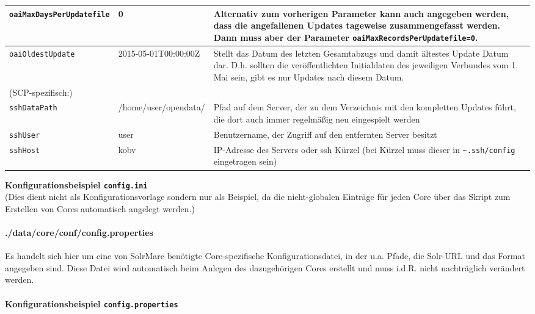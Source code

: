 \documentclass[10pt]{article}
\begin{document}
\begin{center}
\begin{longtable}{| l | p{5cm} | p{5cm} | }
	\texttt{oaiMaxDaysPerUpdatefile} & 0 & Alternativ zum vorherigen Parameter kann auch angegeben werden, dass die angefallenen Updates tageweise zusammengefasst werden. Dann muss aber der Parameter \texttt{oaiMaxRecordsPerUpdatefile=0}.\\ \hline	
	
	\texttt{oaiOldestUpdate} & 2015-05-01T00:00:00Z & Stellt das Datum des letzten Gesamtabzugs und damit ältestes Update Datum dar. D.h. sollten die veröffentlichten Initialdaten des jeweiligen Verbundes vom 1. Mai sein, gibt es nur Updates nach diesem Datum. \\ \hline	
	

	\multicolumn{3}{l}{(SCP-spezifisch:)} \\ \hline
	
	\texttt{sshDataPath} & /home/user/opendata/ & Pfad auf dem Server, der zu dem Verzeichnis mit den kompletten Updates führt, die dort auch immer regelmäßig neu eingespielt werden \\ \hline
	
	\texttt{sshUser} & user & Benutzername, der Zugriff auf den entfernten Server besitzt \\ \hline
		
	\texttt{sshHost} & kobv & IP-Adresse des Servers oder ssh Kürzel (bei Kürzel muss dieser in \texttt{\textasciitilde.ssh/config} eingetragen sein) \\ \hline
	
	
\end{longtable}
\end{center}

\lstset{
	numbers=left, 
	numberstyle=\small, 
	numbersep=8pt, 
	frame = single, 
	language=Pascal, 
	framexleftmargin=15pt,
	breaklines=true
}
\newpage
\textbf{Konfigurationsbeispiel \texttt{config.ini}} \\
(Dies dient nicht als Konfigurationsvorlage sondern nur als Beispiel, da die nicht-globalen Einträge für jeden Core über das Skript zum Erstellen von Cores automatisch angelegt werden.)


\newpage
\paragraph{./data/core/conf/config.properties}
Es handelt sich hier um eine von SolrMarc benötigte Core-spezifische Konfigurationsdatei, in der u.a. Pfade, die Solr-URL und das Format angegeben sind. Diese Datei wird automatisch beim Anlegen des dazugehörigen Cores erstellt und muss i.d.R. nicht nachträglich verändert werden. \\ \\
\textbf{Konfigurationsbeispiel \texttt{config.properties}} 

\end{document}
